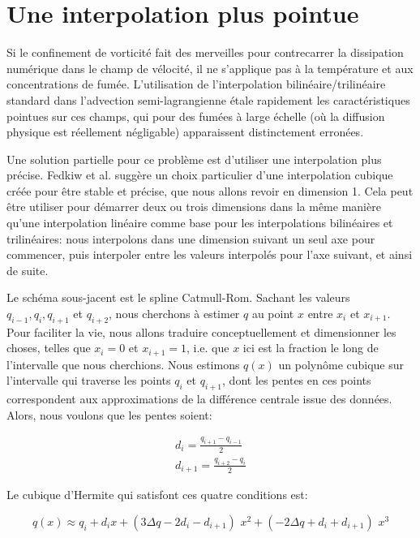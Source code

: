 \documentclass[11pt]{report}
\begin{document}
\section{Une interpolation plus pointue} 

Si le confinement de vorticité fait des merveilles pour contrecarrer la dissipation numérique dans le champ de vélocité, il ne s'applique pas à la température et aux concentrations de fumée. L'utilisation de l'interpolation bilinéaire/trilinéaire standard  dans l'advection semi-lagrangienne étale rapidement les caractéristiques pointues sur ces champs, qui pour des fumées à large échelle (où la diffusion physique est réellement négligable) apparaissent distinctement erronées.\newline

Une solution partielle pour ce problème est d'utiliser une interpolation plus précise. Fedkiw et al. \cite{fedkiw-stam-jensen-01} suggère un choix particulier d'une interpolation cubique créée pour être stable et précise, que nous allons revoir en dimension 1. Cela peut être utiliser pour démarrer deux ou trois dimensions dans la même manière qu'une interpolation linéaire comme base pour les interpolations bilinéaires et trilinéaires: nous interpolons dans une dimension suivant un seul axe pour commencer, puis interpoler entre les valeurs  interpolés pour l'axe suivant, et ainsi de suite.\newline

Le schéma sous-jacent est le spline Catmull-Rom. Sachant les valeurs $q_{i-1}, q_i, q_{i+1} $ et $q_{i+2}$, nous cherchons à estimer $q$ au point $x$ entre $x_i$ et $x_{i+1}$. Pour faciliter la vie, nous allons traduire conceptuellement et dimensionner les choses, telles que $x_i = 0$ et $x_{i+1} = 1$, i.e. que $x$ ici est la fraction le long de l'intervalle que nous cherchions. Nous estimons $q(x)$ un polynôme cubique sur l'intervalle qui traverse les points $q_i$ et $q_{i+1}$, dont les pentes en ces points correspondent aux approximations de la différence centrale issue des données. Alors, nous voulons que les pentes soient:

\begin{eqnarray}
d_i = \frac{q_{i+1} - q_{i-1}}{2}\\
d_{i+1} = \frac{q_{i+2} - q_i}{2}
\end{eqnarray}
  
Le cubique d'Hermite qui satisfont ces quatre conditions est:

\begin{equation}
q(x) \approx q_i + d_i x + (3 \Delta q - 2 d_i - d_{i+1}) \,\, x^2 + (-2 \Delta q + d_i + d_{i+1}) \,\, x^3
\end{equation}
\end{document}
